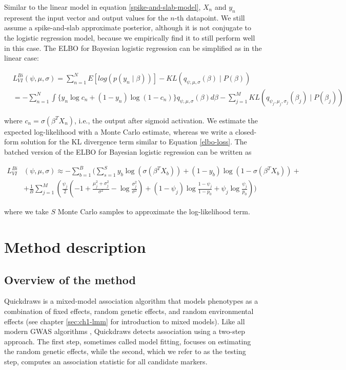Similar to the linear model in equation \ref{spike-and-slab-model}, $X_n$ and $y_n$ represent the input vector and output values for the $n$-th datapoint.
%
We still assume a spike-and-slab approximate posterior, although it is not conjugate to the logistic regression model, because we empirically find it to still perform well in this case.
%
The ELBO for Bayesian logistic regression can be simplified as in the linear case:

\begin{small}
\begin{align}
 &L^{Bi}_{VI}(\psi, \mu, \sigma) = \sum\limits^{N}_{n=1} E[log(p(y_{n} \mid \beta))] - KL(q_{\psi, \mu, \sigma}(\beta) \mid P(\beta)) \nonumber \\
 &= - \sum\limits^{N}_{n=1} \int \{y_n \log c_n + (1-y_n)\log(1-c_n)\} q_{\psi, \mu, \sigma}(\beta) d\beta - \sum\limits^{M}_{j=1} KL(q_{\psi_j, \mu_j, \sigma_j}(\beta_j) \mid P(\beta_j))
\label{spike-and-slab-1}
\end{align}
\end{small}

where $c_n = \sigma(\beta^T X_n)$, i.e., the output after sigmoid activation.
%
We estimate the expected log-likelihood with a Monte Carlo estimate, whereas we write a closed-form solution for the KL divergence term similar to Equation \ref{elbo-loss}.
%
The batched version of the ELBO for Bayesian logistic regression can be written as
%

\begin{align}
    L^{Bi}_{VI}&(\psi, \mu, \sigma) \approx - \sum\limits^{B}_{b=1} \Bigg( \sum\limits^{S}_{s=1} y_b \log(\sigma(\beta^T X_b)) + (1-y_b)\log(1-\sigma(\beta^T X_b)) \nonumber +\\
    &+ \frac{1}{B}\sum\limits^{M}_{j=1} \left(  \frac{\psi_j}{2}\left(-1 + \frac{\mu_j^2 + \sigma_j^2}{\sigma^2} - \log \frac{\sigma_j^2}{\sigma^2} \right) + (1-\psi_j)\log\frac{1 - \psi_j}{1 - p_0} + \psi_j\log\frac{\psi_j}{p_0} \right) \Bigg)
\label{elbo-loss2}
\end{align}

where we take $S$ Monte Carlo samples to approximate the log-likelihood term.


\section{Method description}
\label{sec:ch4-method}
\subsection{Overview of the method}
Quickdraws is a mixed-model association algorithm that models phenotypes as a combination of fixed effects, random genetic effects, and random environmental effects (see chapter \ref{sec:ch1-lmm} for introduction to mixed models).
%
Like all modern GWAS algorithms \cite{loh2015efficient,loh2018mixed,zhou2018efficiently,jiang2019resource,jiang2021generalized,mbatchou2021computationally}, Quickdraws detects association using a two-step approach.
%
The first step, sometimes called model fitting, focuses on estimating the random genetic effects, while the second, which we refer to as the testing step, computes an association statistic for all candidate markers.

